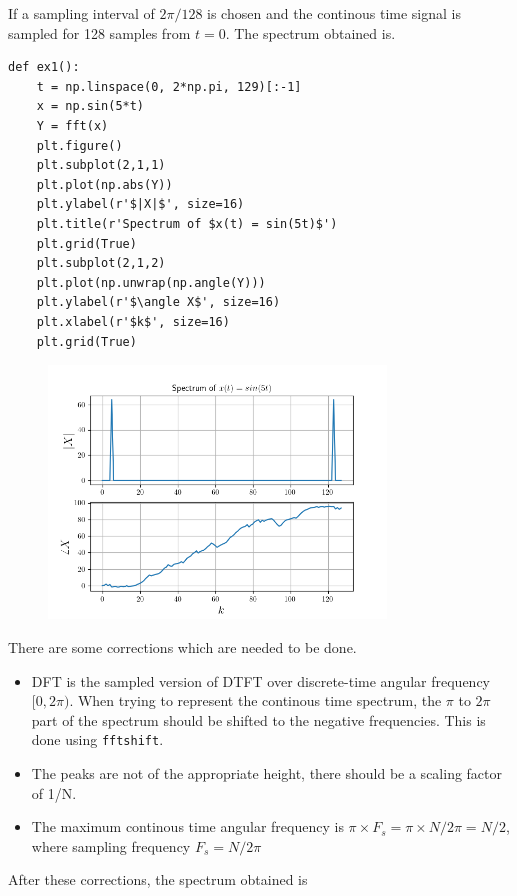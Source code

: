 \documentclass[12pt, a4paper]{article}
\begin{document}
If a sampling interval of $2\pi / 128$ is chosen and the continous time signal is sampled for 128 samples from $t = 0$. The spectrum obtained is.

\begin{lstlisting}
def ex1():
    t = np.linspace(0, 2*np.pi, 129)[:-1]
    x = np.sin(5*t)
    Y = fft(x)
    plt.figure()
    plt.subplot(2,1,1)
    plt.plot(np.abs(Y))
    plt.ylabel(r'$|X|$', size=16)
    plt.title(r'Spectrum of $x(t) = sin(5t)$')
    plt.grid(True)
    plt.subplot(2,1,2)
    plt.plot(np.unwrap(np.angle(Y)))
    plt.ylabel(r'$\angle X$', size=16)
    plt.xlabel(r'$k$', size=16)
    plt.grid(True)
\end{lstlisting}

\begin{figure}[H]
\centering
\includegraphics[width=0.8\textwidth]{ex1.png}
\end{figure}

There are some corrections which are needed to be done.

\begin{itemize}
\item DFT is the sampled version of DTFT over discrete-time angular frequency $[0, 2\pi )$. When trying to represent the continous time spectrum, the $\pi$ to $2\pi$ part of the spectrum should be shifted to the negative frequencies. This is done using \texttt{fftshift}.
\item The peaks are not of the appropriate height, there should be a scaling factor of 1/N.
\item The maximum continous time angular frequency is $\pi \times F_s = \pi \times N/2\pi = N/2$, where sampling frequency $F_s = N/2\pi$
\end{itemize}

After these corrections, the spectrum obtained is
\end{document}
